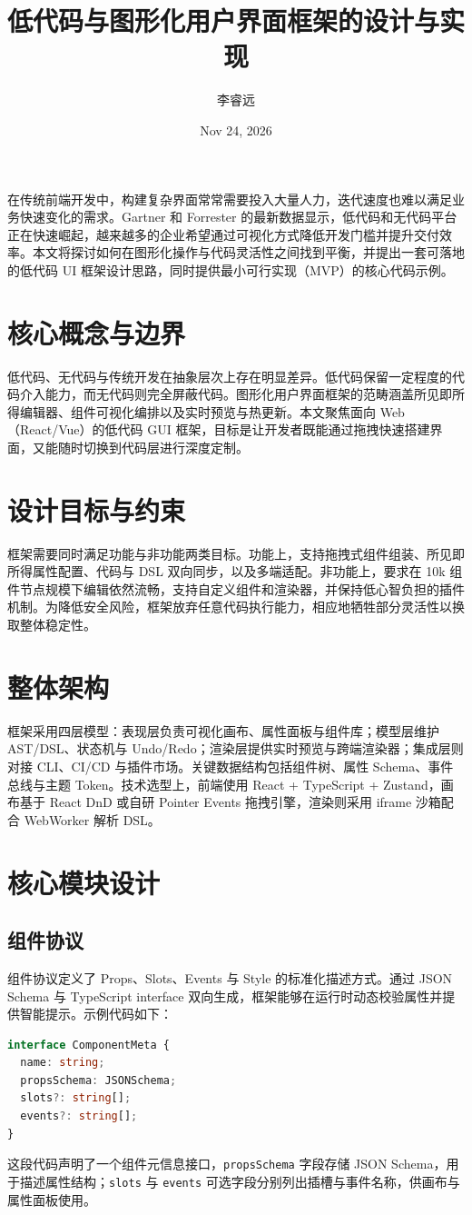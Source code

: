 \title{低代码与图形化用户界面框架的设计与实现}
\author{李睿远}
\date{Nov 24, 2026}
\maketitle
在传统前端开发中，构建复杂界面常常需要投入大量人力，迭代速度也难以满足业务快速变化的需求。Gartner 和 Forrester 的最新数据显示，低代码和无代码平台正在快速崛起，越来越多的企业希望通过可视化方式降低开发门槛并提升交付效率。本文将探讨如何在图形化操作与代码灵活性之间找到平衡，并提出一套可落地的低代码 UI 框架设计思路，同时提供最小可行实现（MVP）的核心代码示例。\par
\chapter{核心概念与边界}
低代码、无代码与传统开发在抽象层次上存在明显差异。低代码保留一定程度的代码介入能力，而无代码则完全屏蔽代码。图形化用户界面框架的范畴涵盖所见即所得编辑器、组件可视化编排以及实时预览与热更新。本文聚焦面向 Web（React/Vue）的低代码 GUI 框架，目标是让开发者既能通过拖拽快速搭建界面，又能随时切换到代码层进行深度定制。\par
\chapter{设计目标与约束}
框架需要同时满足功能与非功能两类目标。功能上，支持拖拽式组件组装、所见即所得属性配置、代码与 DSL 双向同步，以及多端适配。非功能上，要求在 10k 组件节点规模下编辑依然流畅，支持自定义组件和渲染器，并保持低心智负担的插件机制。为降低安全风险，框架放弃任意代码执行能力，相应地牺牲部分灵活性以换取整体稳定性。\par
\chapter{整体架构}
框架采用四层模型：表现层负责可视化画布、属性面板与组件库；模型层维护 AST/DSL、状态机与 Undo/Redo；渲染层提供实时预览与跨端渲染器；集成层则对接 CLI、CI/CD 与插件市场。关键数据结构包括组件树、属性 Schema、事件总线与主题 Token。技术选型上，前端使用 React + TypeScript + Zustand，画布基于 React DnD 或自研 Pointer Events 拖拽引擎，渲染则采用 iframe 沙箱配合 WebWorker 解析 DSL。\par
\chapter{核心模块设计}
\section{组件协议}
组件协议定义了 Props、Slots、Events 与 Style 的标准化描述方式。通过 JSON Schema 与 TypeScript interface 双向生成，框架能够在运行时动态校验属性并提供智能提示。示例代码如下：\par
\begin{lstlisting}[language=ts]
interface ComponentMeta {
  name: string;
  propsSchema: JSONSchema;
  slots?: string[];
  events?: string[];
}
\end{lstlisting}
这段代码声明了一个组件元信息接口，\texttt{propsSchema} 字段存储 JSON Schema，用于描述属性结构；\texttt{slots} 与 \texttt{events} 可选字段分别列出插槽与事件名称，供画布与属性面板使用。\par
